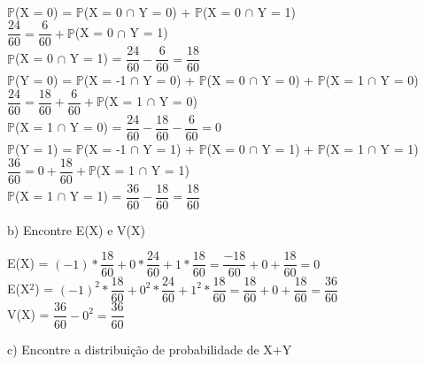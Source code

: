 \documentclass[12pt,a4paper,draft,final,oneside]{article}
\begin{document}
\begin{center}
		\vspace{1cm}\\
		$\mathbb{P}$(X = 0) = $\mathbb{P}$(X = 0 $\cap$ Y = 0) + $\mathbb{P}$(X = 0 $\cap$ Y = 1)\\
		\vspace{0.25cm}
		$\dfrac{24}{60} = \dfrac{6}{60} + \mathbb{P}$(X = 0 $\cap$ Y = 1)\\
		\vspace{0.25cm}
		$\mathbb{P}$(X = 0 $\cap$ Y = 1) = $\dfrac{24}{60} - \dfrac{6}{60} = \dfrac{18}{60}$
		\vspace{1cm}\\
		$\mathbb{P}$(Y = 0) = $\mathbb{P}$(X = -1 $\cap$ Y = 0) + $\mathbb{P}$(X = 0 $\cap$ Y = 0) + $\mathbb{P}$(X = 1 $\cap$ Y = 0)\\
		\vspace{0.25cm}
		$\dfrac{24}{60} = \dfrac{18}{60} + \dfrac{6}{60} + \mathbb{P}$(X = 1 $\cap$ Y = 0)\\
		\vspace{0.25cm}
		$\mathbb{P}$(X = 1 $\cap$ Y = 0) = $\dfrac{24}{60} - \dfrac{18}{60} -\dfrac{6}{60} = 0$
			\vspace{1cm}\\
		$\mathbb{P}$(Y = 1) = $\mathbb{P}$(X = -1 $\cap$ Y = 1) + $\mathbb{P}$(X = 0 $\cap$ Y = 1) + $\mathbb{P}$(X = 1 $\cap$ Y = 1)\\
		\vspace{0.25cm}
		$\dfrac{36}{60} = 0 + \dfrac{18}{60} + \mathbb{P}$(X = 1 $\cap$ Y = 1)\\
		\vspace{0.25cm}
		$\mathbb{P}$(X = 1 $\cap$ Y = 1) = $\dfrac{36}{60} - \dfrac{18}{60} = \dfrac{18}{60}$
	\end{center}
	\vspace{1cm}
	b) Encontre E(X) e V(X)
	\vspace{0.5cm}
	\begin{center}
		E(X) = $(-1)*\dfrac{18}{60} + 0*\dfrac{24}{60} + 1*\dfrac{18}{60} = \dfrac{-18}{60} + 0 + \dfrac{18}{60} = 0$ 
		\vspace{0.5cm}\\
		E(X$^2$) = $(-1)^2*\dfrac{18}{60} + 0^2*\dfrac{24}{60} + 1^2*\dfrac{18}{60} = \dfrac{18}{60} + 0 + \dfrac{18}{60} = \dfrac{36}{60}$
		\vspace{0.5cm}\\
		V(X) = $\dfrac{36}{60} - 0^2 = \dfrac{36}{60}$ 
	\end{center}
	\vspace{1cm}
	c) Encontre a distribuição de probabilidade de X+Y
\end{document}
